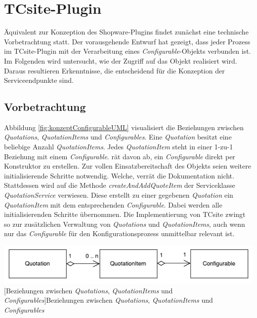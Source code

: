 \documentclass[11pt, a4paper, titlepage, listof=totoc, bibliography=totoc, index=totoc, twoside, openright, headings=normal]{scrreprt}
\begin{document}
\section{TCsite-Plugin}
\label{TCsite-Plugin}
Äquivalent zur Konzeption des Shopware-Plugins findet zunächst eine technische Vorbetrachtung statt. Der vorausgehende Entwurf hat gezeigt, dass jeder Prozess im TCsite-Plugin mit der Verarbeitung eines \emph{Configurable}-Objekts verbunden ist. Im Folgenden wird untersucht, wie der Zugriff auf das Objekt realisiert wird. Daraus resultieren Erkenntnisse, die entscheidend für die Konzeption der Serviceendpunkte sind.

\subsection{Vorbetrachtung}
\label{TCsite-PluginVorbetrachtung}
Abbildung \ref{fig:konzeptConfigurableUML} visualisiert die Beziehungen zwischen \emph{Quotations}, \emph{QuotationItems} und \emph{Configurables}. Eine \emph{Quotation} besitzt eine beliebige Anzahl \emph{QuotationItems}. Jedes \emph{QuotationItem} steht in einer 1-zu-1 Beziehung mit einem \emph{Configurable}. \citet{tactonTCsiteDevelopmentManual} rät davon ab, ein \emph{Configurable} direkt per Konstruktor zu erstellen. Zur vollen Einsatzbereitschaft des Objekts seien weitere initialisierende Schritte notwendig. Welche, verrät die Dokumentation nicht. Stattdessen wird auf die Methode \emph{createAndAddQuoteItem} der Serviceklasse \emph{QuotationService} verwiesen.  Diese erstellt zu einer gegebenen \emph{Quotation} ein \emph{QuotationItem} mit dem entsprechenden \emph{Configurable}. Dabei werden alle initialisierenden Schritte übernommen. Die Implementierung von TCsite zwingt so zur zusätzlichen Verwaltung von \emph{Quotations} und \emph{QuotationItems}, auch wenn nur das \emph{Configurable} für den Konfigurationsprozess unmittelbar relevant ist.

\vspace{1em}
\begin{minipage}{\linewidth}
	\centering
	\includegraphics[width=1\linewidth]{Abbildungen/konzeptConfigurableUML.pdf}
	[Beziehungen zwischen \emph{Quotations}, \emph{QuotationItems} und \emph{Configurables}]{Beziehungen zwischen \emph{Quotations}, \emph{QuotationItems} und \emph{Configurables}}
	\label{fig:konzeptConfigurableUML}
\end{minipage}
\vspace{1em}
\end{document}
